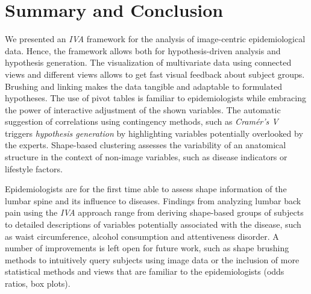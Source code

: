 \documentclass[journal]{style/vgtc} 			          %
\newcommand{\rem}[1]{\textcolor{red}{\sout{#1}}}
\newcommand{\com}[1]{\textcolor{orange}{\uline{#1}}}
\begin{document}
\section{Summary and Conclusion}
We presented an \emph{IVA} framework for the analysis of image-centric epidemiological data.
%
Hence, the framework allows both for hypothesis-driven analysis and hypothesis generation.
%
The visualization of multivariate data using connected views and different views allows to get fast visual feedback about subject groups.
%
Brushing and linking makes the data tangible and adaptable to formulated hypotheses.
%
The use of pivot tables is familiar to epidemiologists while embracing the power of interactive adjustment of the shown variables.
%
The automatic suggestion of correlations using contingency methods, such as \emph{Cram\'{e}r's V} triggers \emph{hypothesis generation} by highlighting variables potentially overlooked by the experts.
%
Shape-based clustering assesses the variability of an anatomical structure in the context of non-image variables, such as disease indicators or lifestyle factors.

Epidemiologists are for the first time able to assess shape information of the lumbar spine and its influence to diseases.
%
Findings from analyzing lumbar back pain using the \emph{IVA} approach range from deriving shape-based groups of subjects to detailed descriptions of variables potentially associated with the disease, such as waist circumference, alcohol consumption and attentiveness disorder.
%
%
A number of improvements is left open for future work, such as shape brushing methods to intuitively query subjects using image data or the inclusion of more statistical methods and views that are familiar to the epidemiologists (odds ratios, box plots).
\end{document}
